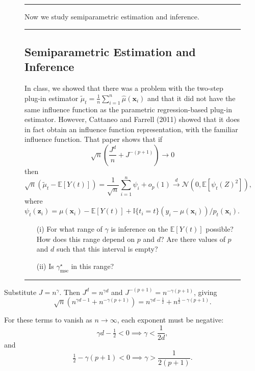 \documentclass{article}
\newenvironment{colorparagraph}[1]{\par\color{#1}}{\par}
\begin{document}
\begin{figure}[H]
  \begin{colorparagraph}{questioncolor}
  \rule{\textwidth}{0.5pt}
  
  Now we study semiparametric estimation and inference.
  
  \rule{\textwidth}{0.5pt}
  \label{q1g}
  \subsection{Semiparametric Estimation and Inference}

  In class, we showed that there was a problem with the two-step plug-in estimator \( \tilde{\mu}_t = \frac{1}{n} \sum_{i=1}^n \hat{\mu}(\mathbf{x}_i) \) and that it did not have the same influence function as the parametric regression-based plug-in estimator. However, Cattaneo and Farrell (2011) showed that it does in fact obtain an influence function representation, with the familiar influence function. That paper shows that if
  \[
  \sqrt{n} \left( \frac{J^d}{n} + J^{-(p+1)} \right) \to 0
  \]
  then
  \[
  \sqrt{n} (\tilde{\mu}_t - \mathbb{E}[Y(t)]) = \frac{1}{\sqrt{n}} \sum_{i=1}^n \psi_i + o_p(1) \overset{d}{\to} \mathcal{N}(0, \mathbb{E}[\psi_t(Z)^2]),
  \]
  where \( \psi_t(\mathbf{z}_i) = \mu(\mathbf{x}_i) - \mathbb{E}[Y(t)] + \mathbb{I}\{t_i = t\}(y_i - \mu(\mathbf{x}_i)) / p_t(\mathbf{x}_i) \).

  \begin{itemize}
      \item[(i)] For what range of \( \gamma \) is inference on the \( \mathbb{E}[Y(t)] \) possible? How does this range depend on \( p \) and \( d \)? Are there values of \( p \) and \( d \) such that this interval is empty?
      \item[(ii)] Is \( \gamma^\star_{\text{mse}} \) in this range?
  \end{itemize}

  \rule{\textwidth}{0.5pt}
  \end{colorparagraph}
\end{figure}

Substitute \( J = n^\gamma \). Then \( J^d = n^{\gamma d} \) and \( J^{-(p+1)} = n^{-\gamma(p+1)} \), giving
\[
\sqrt{n}\left(n^{\gamma d - 1} + n^{-\gamma(p+1)}\right) = n^{\gamma d - \frac{1}{2}} + n^{\frac{1}{2} - \gamma(p+1)}.
\]

For these terms to vanish as \( n \to \infty \), each exponent must be negative:
\[
\gamma d - \tfrac{1}{2} < 0 \implies \gamma < \frac{1}{2d},
\]
and
\[
\tfrac{1}{2} - \gamma(p+1) < 0 \implies \gamma > \frac{1}{2(p+1)}.
\]
\end{document}
